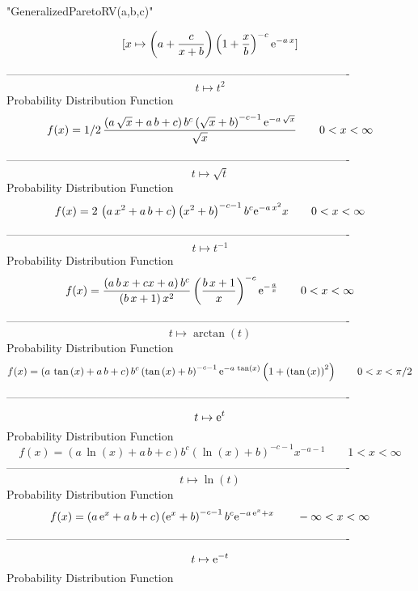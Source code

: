 \documentclass[12pt]{article}
\begin{document}
 
                        "GeneralizedParetoRV(a,b,c)"

$$[x\mapsto  \left( a+{\frac {c}{x+b}} \right)  \left( 1+{\frac {x}{b}}
 \right) ^{-c}{{\rm e}^{-a\,x}}]
$$-------------------------------------------------------------------------------------------  \\$$t\mapsto {t}^{2}
$$Probability Distribution Function 
$$  f(x)=1/2\,{\frac { \left( a\,\sqrt {x}+a\,b+c \right) {b}^{c} \left( \sqrt 
{x}+b \right) ^{-c-1}{{\rm e}^{-a\,\sqrt {x}}}}{\sqrt {x}}}
 \qquad0
 < x < \infty 
$$-------------------------------------------------------------------------------------------  \\$$t\mapsto \sqrt {t}
$$Probability Distribution Function 
$$  f(x)=2\, \left( a\,{x}^{2}+a\,b+c \right)  \left( {x}^{2}+b \right) ^{-c-1}
{b}^{c}{{\rm e}^{-a\,{x}^{2}}}x
 \qquad0
 < x < \infty 
$$-------------------------------------------------------------------------------------------  \\$$t\mapsto {t}^{-1}
$$Probability Distribution Function 
$$  f(x)={\frac { \left( a\,b\,x+cx+a \right) {b}^{c}}{ \left( b\,x+1 \right) {
x}^{2}} \left( {\frac {b\,x+1}{x}} \right) ^{-c}{{\rm e}^{-{\frac {a}{
x}}}}}
 \qquad0
 < x < \infty 
$$-------------------------------------------------------------------------------------------  \\$$t\mapsto \arctan \left( t \right) 
$$Probability Distribution Function 
$$  f(x)= \left( a\,\tan \left( x \right) +a\,b+c \right) {b}^{c} \left( \tan
 \left( x \right) +b \right) ^{-c-1}{{\rm e}^{-a\,\tan \left( x
 \right) }} \left( 1+ \left( \tan \left( x \right)  \right) ^{2}
 \right) 
 \qquad0
 < x < \pi/2
$$-------------------------------------------------------------------------------------------  \\$$t\mapsto {{\rm e}^{t}}
$$Probability Distribution Function 
$$  f(x)= \left( a\,\ln  \left( x \right) +a\,b+c \right) {b}^{c} \left( \ln 
 \left( x \right) +b \right) ^{-c-1}{x}^{-a-1}
 \qquad1
 < x < \infty 
$$-------------------------------------------------------------------------------------------  \\$$t\mapsto \ln  \left( t \right) 
$$Probability Distribution Function 
$$  f(x)= \left( a\,{{\rm e}^{x}}+a\,b+c \right)  \left( {{\rm e}^{x}}+b
 \right) ^{-c-1}{b}^{c}{{\rm e}^{-a\,{{\rm e}^{x}}+x}}
 \qquad-\infty 
 < x < \infty 
$$-------------------------------------------------------------------------------------------  \\$$t\mapsto {{\rm e}^{-t}}
$$Probability Distribution Function 
\end{document}
